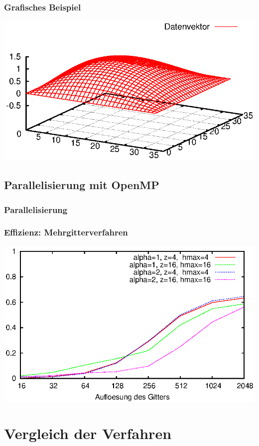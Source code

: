 \documentclass{beamer}
\begin{document}
\begin{frame}\frametitle{Grafisches Beispiel}\includegraphics[trim=25 0 25 0, clip, width=\textwidth]{plots/009}\end{frame}

\subsection{Parallelisierung mit OpenMP}
\begin{frame}
    \frametitle{Parallelisierung}
\end{frame}

\begin{frame}
    \frametitle{Effizienz: Mehrgitterverfahren}
    \includegraphics[width=\textwidth]{plots/effizienzmehrgitter}
\end{frame}

\section{Vergleich der Verfahren}
\end{document}

